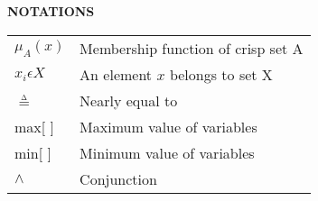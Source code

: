 \newpage
\begin{center}
 {\large\bf NOTATIONS}
\end{center}
\begin{table}[h!]
 \begin{tabular}{p{2cm}p{8cm}}
$\mu _{A}(x)$ & Membership function of crisp set A \\
$x_{i}\epsilon X$ & An element $x$ belongs to set X \\
$\overset{\underset{\mathrm{\Delta }}{}}{=}$ & Nearly equal to \\
max[ ] & Maximum value of variables \\
min[ ] & Minimum value of variables \\
$\wedge$ & Conjunction
 \end{tabular}
 \end{table}

\newpage
\setcounter{page}{1}

